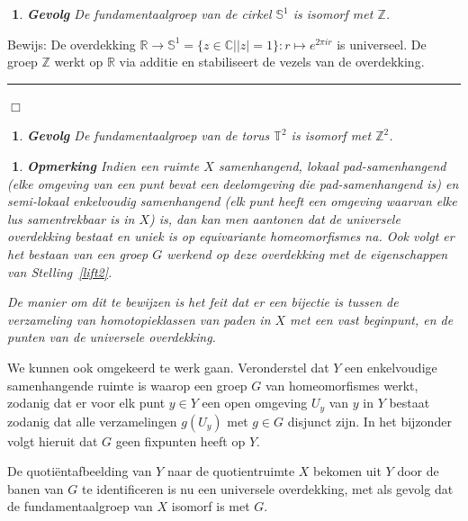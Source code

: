 \documentclass[12pt]{book}
\newcommand{\R}{\mathbb{R}}
\newcommand{\Z}{\mathbb{Z}}
\newcommand{\bew}{{\sc Bewijs: }}
\newcommand{\B}{\rule{1mm}{0mm} \hfill $\Box$ }
\newcommand{\C}{\mathbb{C}}
\newtheorem{gevh}[stelh]{$\!\!$}
\newenvironment{gev}{\begin{gevh}{\em {\bf Gevolg }}}{\end{gevh}}
\newtheorem{opmh}[stelh]{$\!\!$}
\newtheorem{dfh}[stelh]{$\!\!$}
\newenvironment{eopm}{\begin{opmh} \em {\bf Opmerking }}{\end{opmh}}
\newenvironment{df}{\begin{dfh} \em {\bf Definitie }}{\end{dfh}}
\begin{document}
\begin{gev} \label{fundgrpcirkel} 
De fundamentaalgroep van de cirkel $\mathbb{S}^1$ is
isomorf met $\Z$. \end{gev}
\bew
De overdekking $\R \to\mathbb{S}^{1}= \{z\in \C||z|=1\}: r\mapsto e^{2\pi ir}$ is universeel. De groep $\Z$ werkt op $\R$ via additie en stabiliseert de vezels van de overdekking. \B


\begin{gev}
De fundamentaalgroep van de torus $\mathbb{T}^2$ is isomorf met $\Z^2$.
\end{gev}



\begin{eopm}\label{universal} Indien een ruimte $X$ samenhangend, lokaal pad-samenhangend (elke omgeving van een punt bevat een deelomgeving die pad-samenhangend is) en semi-lokaal enkelvoudig samenhangend (elk punt heeft een omgeving waarvan elke lus samentrekbaar is in $X$) is, dan kan men aantonen dat de universele overdekking bestaat en uniek is op equivariante homeomorfismes na. Ook volgt er het bestaan van een groep $G$ werkend op deze overdekking met de eigenschappen van Stelling~\ref{lift2}. 

De manier om dit te bewijzen is het feit dat er een bijectie is tussen de verzameling van homotopieklassen van paden in $X$ met een vast beginpunt, en de punten van de universele overdekking.
\end{eopm}

We kunnen ook omgekeerd te werk gaan.\label{freeaction} Veronderstel dat $Y$ een enkelvoudige samenhangende ruimte is waarop een groep $G$ van homeomorfismes werkt, zodanig dat er voor elk punt $y \in Y$ een open omgeving $U_y$ van $y$ in $Y$ bestaat zodanig dat alle verzamelingen $g(U_y)$ met $g \in G$ disjunct zijn. In het bijzonder volgt hieruit dat $G$ geen fixpunten heeft op $Y$. 

De quoti\"entafbeelding van $Y$ naar de quotientruimte $X$ bekomen uit $Y$ door de banen van $G$ te identificeren is nu een universele overdekking, met als gevolg dat de fundamentaalgroep van $X$ isomorf is met $G$.
\end{document}
